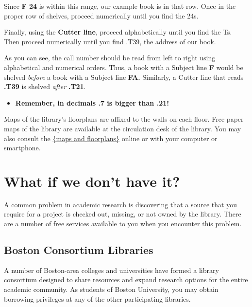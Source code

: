{\begin{center}
\hspace{.4in}{\huge F 7.4\textendash F 45.2}
\end{center}

Since \textbf{F 24} is within this range, our example book is in that row. Once 
in the proper row of shelves, proceed numerically until you find the 24s. 

Finally, using the \textbf{Cutter line}, proceed alphabetically until you find 
the Ts. Then proceed numerically until you find .T39, the address of our book. 

As you can see, the call number should be read from left to right using 
alphabetical and numerical orders. Thus, a book with a Subject line \textbf{F 
}would be shelved \emph{before} a book with a Subject line \textbf{FA.} 
Similarly, a Cutter line that reads \textbf{.T39} is shelved \emph{after} 
\textbf{.T21}. 

\begin{itemize}
\item \textbf{Remember, in decimals .7 is bigger than .21!}
\end{itemize}

Maps of the library's floorplans are affixed to the walls on each floor. Free 
paper maps of the library are available at the circulation desk of the library. 
You may also consult the 
\href{http://www.bu.edu/library/mugar-memorial/about/floorplans/#f=floor-1}{\{maps and floorplans\}} 
online or with your computer or smartphone. 

\section{What if we don't have it?}
    
A common problem in academic research is discovering that a source that you 
require for a project is checked out, missing, or not owned by the library. 
There are a number of free services available to you when you encounter this 
problem.

\subsection{Boston Consortium Libraries}

A number of Boston-area colleges and universities have formed a library 
consortium designed to share resources and expand research options for the 
entire academic community. As students of Boston University, you may obtain 
borrowing privileges at any of the other participating libraries. 

}
